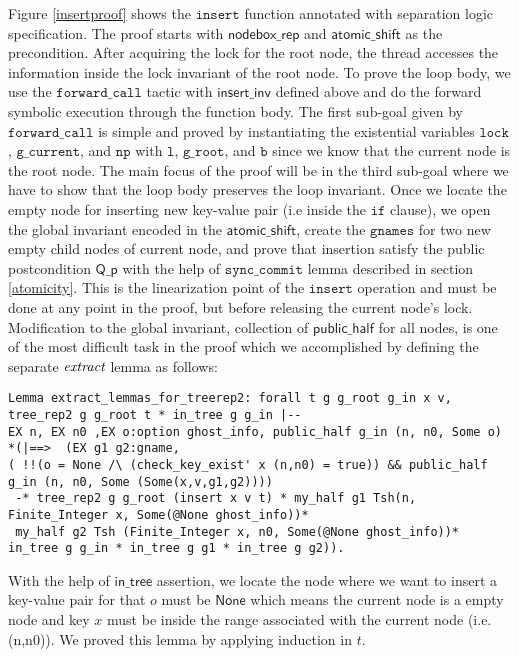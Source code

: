 \documentclass[acmsmall,screen]{acmart}\settopmatter{printfolios=true}
\begin{document}
Figure \ref{insertproof} shows the $\texttt{insert}$ function annotated with separation logic specification. The proof starts with $\mathsf{nodebox\_rep}$ and $\mathsf{atomic\_shift}$ as the precondition. After acquiring the lock for the root node, the thread accesses the information inside the lock invariant of the root node. To prove the loop body, we use the $\texttt{forward\_call}$ tactic with $\mathsf{insert\_inv}$ defined above and do the forward symbolic execution through the function body. The first sub-goal given by  $\texttt{forward\_call}$ is simple and proved by instantiating the existential variables $\texttt{lock}$, $\texttt{g\_current}$, and $\texttt{np}$ with $\texttt{l}$, $\texttt{g\_root}$, and $\texttt{b}$ since we know that the current node is the root node. The main focus of the proof will be in the third sub-goal where we have to show that the loop body preserves the loop invariant. Once we locate the empty node for inserting new key-value pair (i.e inside the $\texttt{if}$ clause), we open the global invariant encoded in the $\mathsf{atomic\_shift}$, create the $\texttt{gnames}$ for two new empty child nodes of current node, and prove that insertion satisfy the public postcondition $\mathsf{Q\_p}$ with the help of $\texttt{sync\_commit}$ lemma described in section \ref{atomicity}. This is the linearization point of the $\texttt{insert}$ operation and must be done at any point in the proof, but before releasing the current node's lock. Modification to the global invariant, collection of $\mathsf{public\_half}$ for all nodes, is one of the most difficult task in the proof which we accomplished by defining the separate $\emph{extract}$ lemma as follows:
\begin{verbatim}
Lemma extract_lemmas_for_treerep2: forall t g g_root g_in x v, tree_rep2 g g_root t * in_tree g g_in |-- 
EX n, EX n0 ,EX o:option ghost_info, public_half g_in (n, n0, Some o) *(|==>  (EX g1 g2:gname,
( !!(o = None /\ (check_key_exist' x (n,n0) = true)) && public_half g_in (n, n0, Some (Some(x,v,g1,g2))))
 -* tree_rep2 g g_root (insert x v t) * my_half g1 Tsh(n, Finite_Integer x, Some(@None ghost_info))*
 my_half g2 Tsh (Finite_Integer x, n0, Some(@None ghost_info))* in_tree g g_in * in_tree g g1 * in_tree g g2)).
\end{verbatim}
With the help of $\mathsf{in\_tree}$ assertion, we locate the node where we want to insert a key-value pair for that $o$ must be $\mathsf{None}$ which means the current node is a empty node and key $x$ must be inside the range associated with the current node (i.e. (n,n0)). We proved this lemma by applying induction in $t$.
\end{document}
